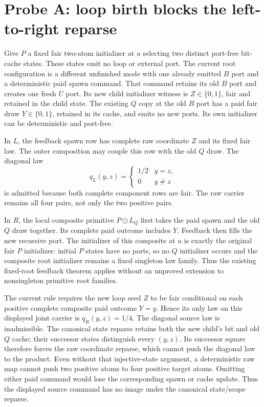 \documentclass[11pt]{article}\usepackage{amsmath,amssymb,geometry}\geometry{margin=1in}
\begin{document}
\section*{Probe A: loop birth blocks the left-to-right reparse}
Give $P$ a fixed fair two-atom initializer at $u$ selecting two distinct port-free bit-cache states. These states emit no loop or external port. The current root configuration is a different unfinished mode with one already emitted $B$ port and a deterministic paid spawn command. That command retains its old $B$ port and creates one fresh $U$ port. Its new child initializer witness is $Z\in\{0,1\}$, fair and retained in the child state. The existing $Q$ copy at the old $B$ port has a paid fair draw $Y\in\{0,1\}$, retained in its cache, and emits no new ports. Its own initializer can be deterministic and port-free.

In $L$, the feedback spawn row has complete raw coordinate $Z$ and its fixed fair law. The outer composition may couple this row with the old $Q$ draw. The diagonal law
\[
q_L(y,z)=\begin{cases}1/2&y=z,\\0&y\ne z\end{cases}
\]
is admitted because both complete component rows are fair. The raw carrier remains all four pairs, not only the two positive pairs.

In $R$, the local composite primitive $P\odot L_Q$ first takes the paid spawn and the old $Q$ draw together. Its complete paid outcome includes $Y$. Feedback then fills the new recursive port. The initializer of this composite at $u$ is exactly the original fair $P$ initializer: initial $P$ states have no ports, so no $Q$ initializer occurs and the composite root initializer remains a fixed singleton law family. Thus the existing fixed-root feedback theorem applies without an unproved extension to nonsingleton primitive root families.

The current rule requires the new loop seed $Z$ to be fair conditional on each positive complete composite paid outcome $Y=y$. Hence its only law on this displayed joint carrier is $q_R(y,z)=1/4$. The diagonal source law is inadmissible. The canonical state reparse retains both the new child's bit and old $Q$ cache; their successor states distinguish every $(y,z)$. Its successor square therefore forces the raw coordinate reparse, which cannot push the diagonal law to the product. Even without that injective-state argument, a deterministic raw map cannot push two positive atoms to four positive target atoms. Omitting either paid command would lose the corresponding spawn or cache update. Thus the displayed source command has no image under the canonical state/scope reparse.
\end{document}

